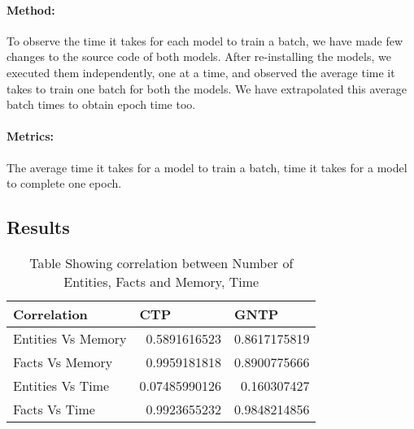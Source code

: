 \documentclass[Other]{iitddiss}
\begin{document}
\paragraph{Method: }
To observe the time it takes for each model to train a batch, we have made few changes to the source code of both models. After re-installing the models, we executed them independently, one at a time, and observed the average time it takes to train one batch for both the models. We have extrapolated this average batch times to obtain epoch time too.

\paragraph{Metrics:}
The average time it takes for a model to train a batch, time it takes for a model to complete one epoch.

\subsection{Results}

\begin{table}[H]
	\centering
	\begin{tabular}{|l|r|r|}
		\hline
		\textbf{Correlation} & \multicolumn{1}{l|}{\textbf{CTP}} & \multicolumn{1}{l|}{GNTP} \\ \hline
		Entities Vs Memory   & 0.5891616523                      & 0.8617175819              \\ \hline
		Facts Vs Memory      & 0.9959181818                      & 0.8900775666              \\ \hline
		Entities Vs Time     & 0.07485990126                     & 0.160307427               \\ \hline
		Facts Vs Time        & 0.9923655232                      & 0.9848214856              \\ \hline
		
	\end{tabular}
	\caption{Table Showing correlation between Number of Entities, Facts and Memory, Time}
	\label{tab:correlation}
\end{table}
\end{document}
